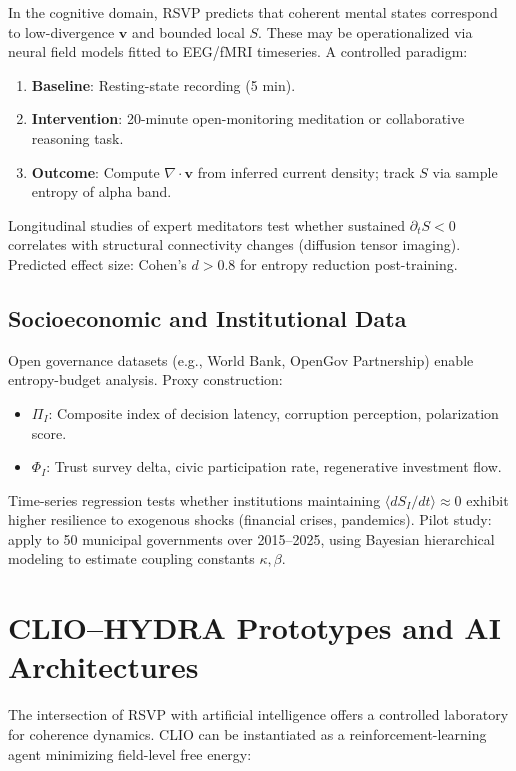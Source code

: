\documentclass[12pt,a4paper]{article}
\begin{document}
In the cognitive domain, RSVP predicts that coherent mental states correspond to low-divergence $\bm{v}$ and bounded local $S$. These may be operationalized via neural field models \cite{deco2008dynamic} fitted to EEG/fMRI timeseries. A controlled paradigm:
\begin{enumerate}
\item \textbf{Baseline}: Resting-state recording (5 min).
\item \textbf{Intervention}: 20-minute open-monitoring meditation or collaborative reasoning task.
\item \textbf{Outcome}: Compute $\nabla\!\cdot\!\bm{v}$ from inferred current density; track $S$ via sample entropy of alpha band.
\end{enumerate}

Longitudinal studies of expert meditators test whether sustained $\partial_t S < 0$ correlates with structural connectivity changes (diffusion tensor imaging). Predicted effect size: Cohen’s $d > 0.8$ for entropy reduction post-training.

\subsection{Socioeconomic and Institutional Data}

Open governance datasets (e.g., World Bank, OpenGov Partnership) enable entropy-budget analysis. Proxy construction:
\begin{itemize}
\item $\Pi_I$: Composite index of decision latency, corruption perception, polarization score.
\item $\Phi_I$: Trust survey delta, civic participation rate, regenerative investment flow.
\end{itemize}

Time-series regression tests whether institutions maintaining $\langle dS_I/dt \rangle \approx 0$ exhibit higher resilience to exogenous shocks (financial crises, pandemics). Pilot study: apply to 50 municipal governments over 2015--2025, using Bayesian hierarchical modeling to estimate coupling constants $\kappa, \beta$.

\section{CLIO--HYDRA Prototypes and AI Architectures}

The intersection of RSVP with artificial intelligence offers a controlled laboratory for coherence dynamics. CLIO can be instantiated as a reinforcement-learning agent minimizing field-level free energy:
\end{document}
